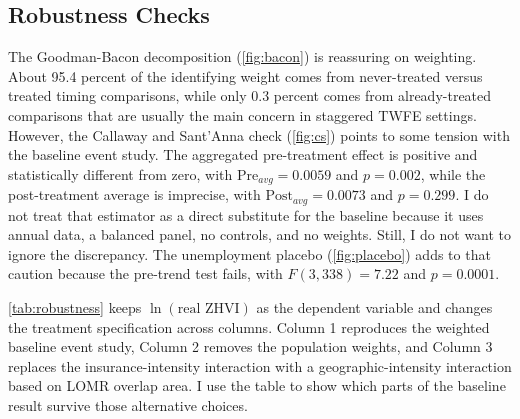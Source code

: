 \documentclass[12pt]{article}
\begin{document}
\subsection{Robustness Checks}\label{sec:robustness_checks}

The Goodman-Bacon decomposition (\autoref{fig:bacon}) is reassuring on weighting. About 95.4 percent of the identifying weight comes from never-treated versus treated timing comparisons, while only 0.3 percent comes from already-treated comparisons that are usually the main concern in staggered TWFE settings. However, the Callaway and Sant'Anna check (\autoref{fig:cs}) points to some tension with the baseline event study. The aggregated pre-treatment effect is positive and statistically different from zero, with $\text{Pre}_{avg} = 0.0059$ and $p = 0.002$, while the post-treatment average is imprecise, with $\text{Post}_{avg} = 0.0073$ and $p = 0.299$. I do not treat that estimator as a direct substitute for the baseline because it uses annual data, a balanced panel, no controls, and no weights. Still, I do not want to ignore the discrepancy. The unemployment placebo (\autoref{fig:placebo}) adds to that caution because the pre-trend test fails, with $F(3,338) = 7.22$ and $p = 0.0001$.

\autoref{tab:robustness} keeps $\ln(\text{real ZHVI})$ as the dependent variable and changes the treatment specification across columns. Column 1 reproduces the weighted baseline event study, Column 2 removes the population weights, and Column 3 replaces the insurance-intensity interaction with a geographic-intensity interaction based on LOMR overlap area. I use the table to show which parts of the baseline result survive those alternative choices.


\end{document}
